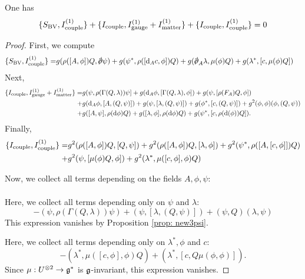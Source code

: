 \documentclass[10pt, oneside]{article}
\begin{document}
\begin{lem} One has
\[
\{S_{\rm BV} , I^{(1)}_{\rm couple}\} + \{I_{\rm couple}, I^{(1)}_{\rm gauge} + I^{(1)}_{\rm matter}\} + \{I_{\rm couple}, I^{(1)}_{\rm couple}\}  =  0 
\]
\end{lem}
\begin{proof}
First, we compute
\begin{align*}
\{S_{\rm BV} , I^{(1)}_{\rm couple}\} = & g (\rho([A, \phi]) Q, \sd \dd \psi) + g (\psi^*, \rho([\d_A c, \phi]) Q) + g (\sd \dd_A \lambda, \mu(\phi) Q) + g (\lambda^*, [c, \mu(\phi) Q]) 
\end{align*}
Next,
\begin{align*}
\{I_{\rm couple} , I^{(1)}_{\rm gauge} + I^{(1)}_{\rm matter}\} = & g (\psi, \rho(\Gamma(Q, \lambda)) \psi] + g ({\rm d}_A \phi, [\Gamma(Q, \lambda), \phi]) + g (\psi, [\rho(F_A) Q, \phi]) \\ + & g ({\rm d}_A \phi, [A, (Q, \psi)]) + g (\psi, [\lambda, (Q, \psi)]) + g (\phi^*, [c, (Q,\psi)]) + g^2 (\phi, \phi) (\phi, (Q, \psi)) \\ + & g ([A, \psi] , \rho({\rm d} \phi)Q) + g ([\lambda, \phi] , \rho ({\rm d} \phi) Q) + g (\psi^*, [c , \rho({\rm d}(\phi)) Q]) . 
\end{align*}
Finally,
\begin{align*}
\{I_{\rm couple}, I^{(1)}_{\rm couple}\} = & g^2 (\rho([A,\phi]) Q, [Q,\psi]) + g^2 (\rho([A,\phi]) Q, [\lambda, \phi]) + g^2 (\psi^*, \rho([A, [c,\phi]]) Q) \\ + & g^2 (\psi, [\mu(\phi) Q, \phi]) + g^2 (\lambda^*, \mu([c,\phi], \phi) Q)
\end{align*}

Now, we collect all terms depending on the fields $A, \phi, \psi$:
\begin{align*}
\end{align*} 

Here, we collect all terms depending only on $\psi$ and $\lambda$:
\[
- (\psi, \rho(\Gamma(Q, \lambda)) \psi) + (\psi, [\lambda, (Q, \psi)]) + (\psi, Q) (\lambda, \psi)
\]
This expression vanishes by Proposition \ref{prop: new3psi}.

Here, we collect all terms depending only on $\lambda^*, \phi$ and $c$:
\[
- (\lambda^*, \mu([c, \phi], \phi) Q) + (\lambda^*, [c, Q \mu(\phi,\phi)]) .
\]
Since $\mu : U^{\otimes 2} \to \mathfrak g^*$ is $\mathfrak g$-invariant, this expression vanishes. 
\end{proof}
\end{document}
